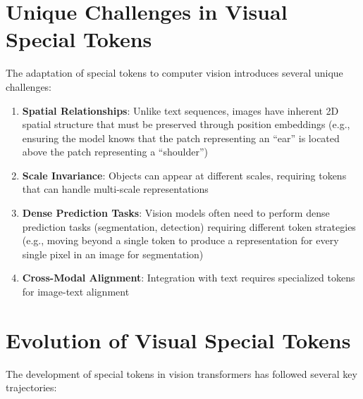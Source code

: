 \section{Unique Challenges in Visual Special Tokens}

The adaptation of special tokens to computer vision introduces several unique challenges:

\begin{enumerate}
\item \textbf{Spatial Relationships}: Unlike text sequences, images have inherent 2D spatial structure that must be preserved through position embeddings (e.g., ensuring the model knows that the patch representing an ``ear'' is located above the patch representing a ``shoulder'')
\item \textbf{Scale Invariance}: Objects can appear at different scales, requiring tokens that can handle multi-scale representations
\item \textbf{Dense Prediction Tasks}: Vision models often need to perform dense prediction tasks (segmentation, detection) requiring different token strategies (e.g., moving beyond a single \cls{} token to produce a representation for every single pixel in an image for segmentation)
\item \textbf{Cross-Modal Alignment}: Integration with text requires specialized tokens for image-text alignment
\end{enumerate}
\begin{comment}
Feedback: This is a great list of challenges. To make it more concrete for the reader, you could add a brief, specific example for one or two points. For "Spatial Relationships," you could add: "(e.g., ensuring the model knows that the patch representing an 'ear' is located above the patch representing a 'shoulder')." For "Dense Prediction Tasks," you could add: "(e.g., moving beyond a single [CLS] token to produce a representation for every single pixel in an image for segmentation)."

STATUS: addressed - added specific examples for Spatial Relationships and Dense Prediction Tasks challenges
\end{comment}

\section{Evolution of Visual Special Tokens}

The development of special tokens in vision transformers has followed several key trajectories:

